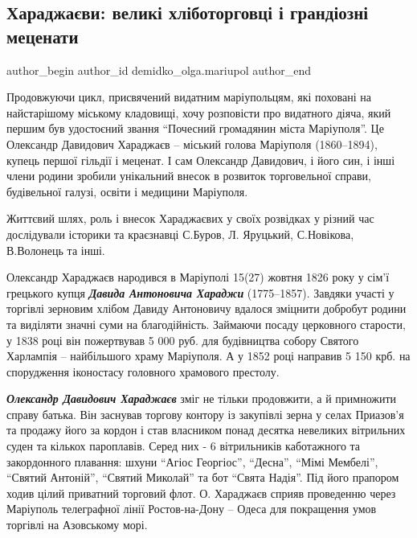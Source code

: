  
 
 
 
 
 
\subsection{Хараджаєви: великі хліботорговці і грандіозні меценати}
\label{sec:22_11_2021.stz.news.ua.mrpl_city.1.haradzhajevy_mecenaty}
 
\ifcmt
 author_begin
   author_id demidko_olga.mariupol
 author_end
\fi


Продовжуючи цикл, присвячений видатним маріупольцям, які поховані на
найстарішому міському кладовищі, хочу розповісти про видатного діяча, який
першим був удостоєний звання \enquote{Почесний громадянин міста Маріуполя}. Це
Олександр Давидович Хараджаєв – міський голова Маріуполя (1860–1894), купець
першої гільдії і меценат. І сам Олександр Давидович, і його син, і інші члени
родини зробили унікальний внесок в розвиток торговельної справи, будівельної
галузі, освіти і медицини Маріуполя.

Життєвий шлях, роль і внесок Хараджаєвих у своїх розвідках у різний час
дослідували історики та краєзнавці С.Буров, Л. Яруцький, С.Новікова, В.Волонець
та інші.

Олександр Хараджаєв народився в Маріуполі 15(27) жовтня 1826 року у сім'ї
грецького купця \textbf{\emph{Давида Антоновича Хараджи}} (1775–1857). Завдяки участі у
торгівлі зерновим хлібом Давиду Антоновичу вдалося зміцнити добробут родини та
виділяти значні суми на благодійність. Займаючи посаду церковного старости, у
1838 році він пожертвував 5 000 руб. для будівництва собору Святого Харлампія –
найбільшого храму Маріуполя. А у 1852 році направив 5 150 крб. на спорудження
іконостасу головного храмового престолу.

\emph{\textbf{Олександр Давидович Хараджаєв}} зміг не тільки продовжити, а й примножити справу
батька.  Він заснував торгову контору із закупівлі зерна у селах Приазов'я та
продажу його за кордон і став власником понад десятка невеликих вітрильних
суден та кількох пароплавів. Серед них - 6 вітрильників каботажного та
закордонного плавання: шхуни \enquote{Агіос Георгіос}, \enquote{Десна}, \enquote{Мімі Мембелі}, \enquote{Святий
Антоній}, \enquote{Святий Миколай} та бот \enquote{Свята Надія}. Під його прапором ходив цілий
приватний торговий флот. О. Хараджаєв сприяв проведенню через Маріуполь
телеграфної лінії Ростов-на-Дону – Одеса для покращення умов торгівлі на
Азовському морі.

